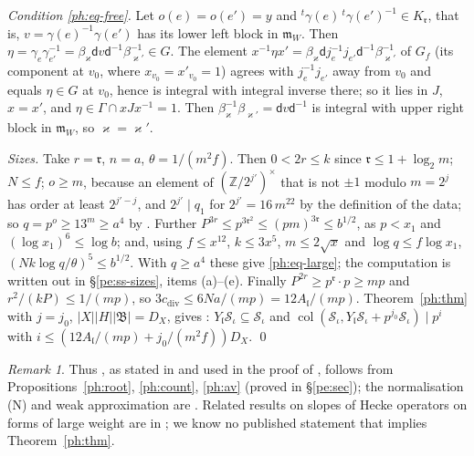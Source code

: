 \documentclass[10pt]{amsart}
\theoremstyle{definition}
\theoremstyle{remark}
\newtheorem{remark}[theorem]{Remark}
\newcommand{\Z}{\mathbb Z}
\providecommand{\auDX}{D_X}
\providecommand{\auS}{\mathcal S}
\providecommand{\aucol}{\operatorname{col}}
\providecommand{\pam}{\mathfrak m}
\providecommand{\phB}{\mathfrak B}
\providecommand{\phcd}{c_{\mathrm{div}}}
\begin{document}
\emph{Condition \eqref{ph:eq-free}.} Let $o(e)=o(e')=y$ and ${}^t\gamma(e)\,{}^t\gamma(e')^{-1}\in
K_{\mathfrak r}$, that is, $v=\gamma(e)^{-1}\gamma(e')$ has its lower left block in $\pam_W$. Then
$\eta=\gamma_e\gamma_{e'}^{-1}=\beta_\varkappa\mathsf dv\mathsf d^{-1}\beta_{\varkappa'}^{-1}\in
G$. The element $x^{-1}\eta x'=\beta_\varkappa\mathsf dj_e^{-1}j_{e'}\mathsf d^{-1}
\beta_{\varkappa'}^{-1}$ of $G_f$ (its component at $v_0$, where $x_{v_0}=x'_{v_0}=1$) agrees
with $j_e^{-1}j_{e'}$ away from $v_0$ and equals $\eta\in G$ at $v_0$, hence is integral with
integral inverse there; so it lies in $J$, $x=x'$, and
$\eta\in\Gamma\cap xJx^{-1}=1$. Then $\beta_\varkappa^{-1}\beta_{\varkappa'}=\mathsf dv\mathsf
d^{-1}$ is integral with upper right block in $\pam_W$, so $\varkappa=\varkappa'$.

\emph{Sizes.} Take $r=\mathfrak r$, $n=a$, $\theta=1/(m^2f)$. Then $0<2r\le k$ since
$\mathfrak r\le1+\log_2m$; $N\le f$; $o\ge m$, because an element of $(\Z/2^{j'})^\times$ that is
not $\pm1$ modulo $m=2^{j}$ has order at least $2^{j'-j}$, and $2^{j'}\mid q_1$ for $2^{j'}=16\,m^{22}$ by the
definition of the data; so
$q=p^o\ge13^m\ge a^4$ by {\cite[(36)]{P46}}. Further $P^{3r}\le p^{3\mathfrak r^2}\le(pm)^{3
\mathfrak r}\le b^{1/2}$, as $p<x_1$ and $(\log x_1)^6\le\log b$; and, using $f\le x^{12}$,
$k\le3x^5$, $m\le2\sqrt x$ and $\log q\le f\log x_1$, $(Nk\log q/\theta)^5\le b^{1/2}$. With
$q\ge a^4$ these give \eqref{ph:eq-large}; the computation is written out in
\S\ref{pe:ss-sizes}, items (a)--(e). Finally $P^{2r}\ge p^{\mathfrak r}\cdot p\ge mp$ and $r^2/(kP)\le1/(mp)$, so
$3\phcd\le6Na/(mp)=12A_{\mathfrak l}/(mp)$. Theorem~\ref{ph:thm} with $j=j_0$,
$|X||H||\phB|=\auDX$, gives {\cite[Lemma~4.19]{P49}}: $Y_{\mathfrak l}\auS_\iota\subseteq\auS_\iota$
and $\aucol(\auS_\iota,Y_{\mathfrak l}\auS_\iota+p^{j_0}\auS_\iota)\mid p^i$ with
$i\le(12A_{\mathfrak l}/(mp)+j_0/(m^2f))\auDX$. \qed

\begin{remark}\label{ph:status-eldiv}
Thus {\cite[Lemma~4.19]{P49}}, as stated in {\cite[\S4.5]{P49}} and used in the proof of
{\cite[Theorem~4.21(iv)]{P49}}, follows from Propositions~\ref{ph:root}, \ref{ph:count}, \ref{ph:av}
(proved in \S\ref{pe:sec}); the normalisation (N) and weak approximation are {\cite[\S\S6.1 and~6.2]{P49}}. Related results on
slopes of Hecke operators on forms of large weight are in \cite{LTXZ}; we know no published
statement that implies Theorem~\ref{ph:thm}.
\end{remark}
\end{document}
